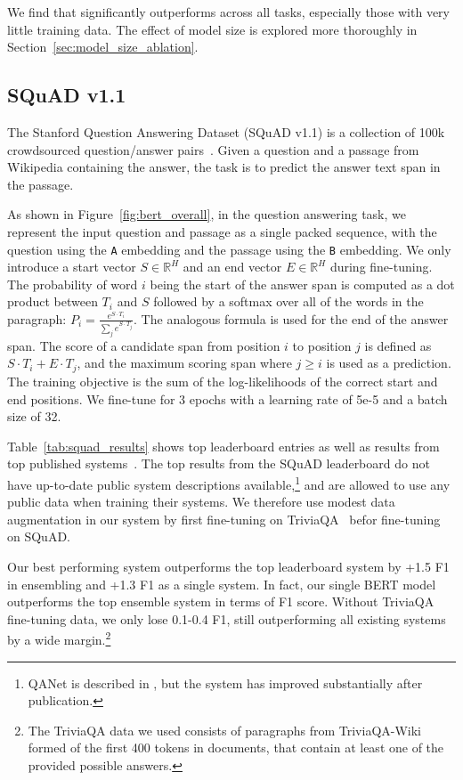 We find that \bertlarge significantly outperforms \bertbase across all tasks, especially those with very little training data. The effect of model size is explored more thoroughly in Section~\ref{sec:model_size_ablation}.

\subsection{SQuAD v1.1}
\label{sec:squad}

The Stanford Question Answering Dataset (SQuAD v1.1) is a collection of 100k crowdsourced question/answer pairs~\cite{rajpurkar-etal:2016:_squad}. Given a question and a passage from Wikipedia containing the answer, the task is to predict the answer text span in the passage. 

\ignorespaces

As shown in Figure~\ref{fig:bert_overall}, in the question answering task, we represent the input question and passage as a single packed sequence, with the question using the {\tt A} embedding and the passage using the {\tt B} embedding. We only introduce a start vector $S \in \mathbb{R}^H$ and an end vector $E \in \mathbb{R}^H$ during fine-tuning. The probability of word $i$ being the start of the answer span is computed as a dot product between $T_i$ and $S$ followed by a softmax over all of the words in the paragraph: $P_i = \frac{e^{S{\cdot}T_i}}{\sum_j e^{S{\cdot}T_j}}$. The analogous formula is used for the end of the answer span. The score of a candidate span from position $i$ to position $j$ is defined as  $S{\cdot}T_i + E{\cdot}T_j$, and the maximum scoring span where $j \geq i$ is used as a prediction. The training objective is the sum of the log-likelihoods of the correct start and end positions. We fine-tune for 3 epochs with a learning rate of 5e-5 and a batch size of 32. 

Table~\ref{tab:squad_results} shows top leaderboard entries as well as results from top published systems~\cite{bidaf,clark-gardner:2018:_simpl,peters-etal:2018:_deep,hu2017reinforced}. The top results from the SQuAD leaderboard do not have up-to-date public system descriptions available,\footnote{QANet is described in , but the system has improved substantially after publication.} and are allowed to use any public data when training their systems. We therefore use modest data augmentation in our system by first fine-tuning on TriviaQA~\cite{joshi-etal:2017:_triviaq} befor fine-tuning on SQuAD.

Our best performing system outperforms the top leaderboard system by +1.5 F1 in ensembling and +1.3 F1 as a single system. In fact, our single BERT model outperforms the top ensemble system in terms of F1 score. Without TriviaQA fine-tuning data, we only lose 0.1-0.4 F1, still outperforming all existing systems by a wide margin.\footnote{The TriviaQA data we used consists of paragraphs from TriviaQA-Wiki formed of the first 400 tokens in documents, that contain at least one of the provided possible answers.}

